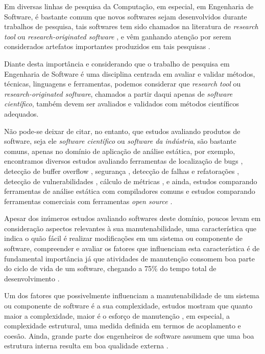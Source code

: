 
Em diversas linhas de pesquisa da Computação, em especial, em Engenharia de
Software, é bastante comum que novos softwares sejam desenvolvidos durante
trabalhos de pesquisa, tais softwares tem sido chamados na literatura de {\it research tool}
\cite{Portillo12} ou {\it research-originated software} \cite{Kon2011}, e vêm
ganhando atenção por serem considerados artefatos importantes produzidos em tais
pesquisas \cite{Stodden2009}.

Diante desta importância e considerando que o trabalho de pesquisa em Engenharia de Software
é uma disciplina centrada em avaliar e validar métodos, técnicas, linguagens e
ferramentas, podemos considerar que {\it research tool} ou {\it
research-originated software}, chamados a partir daqui apenas de {\it software
científico}, também devem ser avaliados e validados com métodos
científicos adequados.

Não pode-se deixar de citar, no entanto, que estudos avaliando produtos de
software, seja ele {\it software científico} ou {\it software da indústria}, são bastante comuns, apenas
no domínio de aplicação de análise estática, por exemplo, encontramos diversos estudos
avaliando ferramentas de localização de bugs \cite{Rutar2004},
detecção de buffer overflow \cite{Kratkiewicz2005},
segurança \cite{Okun2007, Johns2011},
detecção de falhas e refatorações \cite{Wedyan2009},
detecção de vulnerabilidades \cite{Li2010, Ataide2014},
cálculo de métricas \cite{Alemerien2013}, e ainda, estudos
comparando ferramentas de análise estática com compiladores comuns \cite{Emanuelsson2008}
e estudos comparando ferramentas comerciais com ferramentas {\it open source} \cite{Al2010}.

Apesar dos inúmeros estudos avaliando softwares deste domínio,
poucos levam em consideração aspectos relevantes à sua
manutenabilidade, uma característica que indica o quão fácil é realizar
modificações em um sistema ou componente de software, compreender e avaliar os
fatores que influenciam esta característica é de fundamental importância já que
atividades de manutenção consomem boa parte do ciclo de vida de um software,
chegando a 75\% do tempo total de desenvolvimento \cite{aggarwal2002integrated, kumar2012survey}.

Um dos fatores que possivelmente influenciam a manutenabilidade de um sistema
ou componente de software é a sua complexidade, estudos mostram que quanto
maior a complexidade, maior é o esforço de manutenção \cite{hashim1996software, Darcy2005}, em
especial, a complexidade estrutural, uma medida definida em termos de
acoplamento e coesão. Ainda, grande parte dos engenheiros de software assumem que uma
boa estrutura interna resulta em boa qualidade externa \cite{Fenton2014}.

